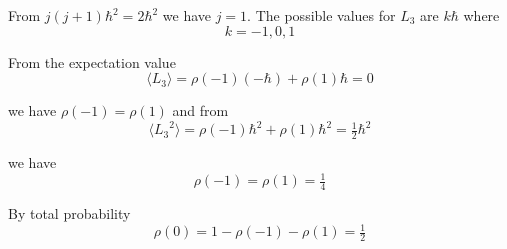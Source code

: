 


\bigskip
From $j(j+1)\hbar^2=2\hbar^2$ we have $j=1$.
The possible values for $L_3$ are $k\hbar$ where
\begin{equation*}
k=-1,0,1
\end{equation*}

From the expectation value
\begin{equation*}
\langle L_3\rangle=\rho(-1)(-\hbar)+\rho(1)\hbar=0
\end{equation*}

we have $\rho(-1)=\rho(1)$ and from
\begin{equation*}
\langle{L_3}^2\rangle=\rho(-1)\hbar^2+\rho(1)\hbar^2=\tfrac{1}{2}\hbar^2
\end{equation*}

we have
\begin{equation*}
\rho(-1)=\rho(1)=\tfrac{1}{4}
\end{equation*}

By total probability
\begin{equation*}
\rho(0)=1-\rho(-1)-\rho(1)=\tfrac{1}{2}
\end{equation*}


